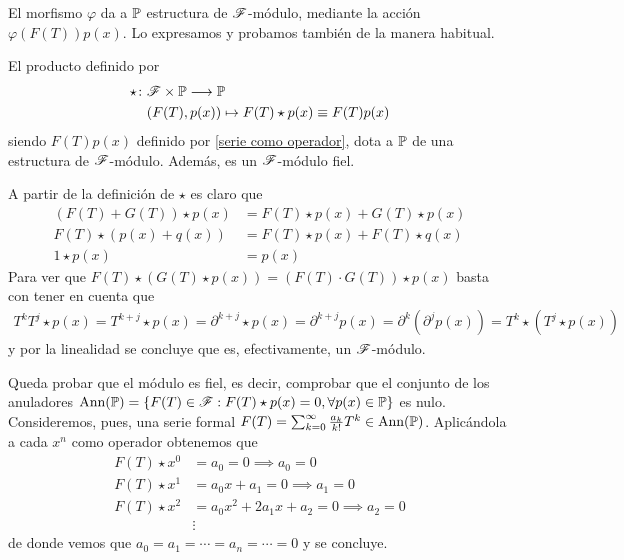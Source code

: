 El morfismo $\varphi$ da a $\mathbb{P}$ estructura de $\mathscr{F}$-módulo, mediante la acción $\varphi(F(T)) p(x)$. Lo expresamos y probamos también de la manera habitual.


\begin{teorema}
    El producto definido por
    \begin{align*}
        \star \colon & \mathscr{F} \times \mathbb{P} \longrightarrow \mathbb{P}\\
        & (F(T), p(x)) \mapsto F(T) \star p(x) \equiv F(T) p(x)
    \end{align*}
    siendo $F(T) p(x)$ definido por \eqref{serie como operador}, dota a $\mathbb{P}$ de una estructura de $\mathscr{F}$-módulo. Además, es un $\mathscr{F}$-módulo fiel.
\end{teorema}
\begin{demo}
    A partir de la definición de $\star$ es claro que
    \begin{align*}
        (F(T) + G(T)) \star p(x) & = F(T) \star p(x) + G(T) \star p(x)\\
        F(T) \star (p(x) + q(x)) & = F(T) \star p(x) + F(T) \star q(x)\\
        1 \star p(x) & = p(x)
    \end{align*}
    Para ver que $F(T) \star (G(T) \star p(x)) = (F(T) \cdot G(T)) \star p(x)$ basta con tener en cuenta que
    \begin{align*}
        T^k T^j \star p(x) = T^{k+j} \star p(x) = \partial^{k+j} \star p(x) = \partial^{k+j} p(x) = \partial^k(\partial^j p(x)) = T^k \star (T^j \star p(x)) 
    \end{align*}
    y por la linealidad se concluye que es, efectivamente, un $\mathscr{F}$-módulo.

    Queda probar que el módulo es fiel, es decir, comprobar que el conjunto de los anuladores $\text{Ann}(\mathbb{P}) = \{ F(T) \in \mathscr{F} : F(T) \star p(x) = 0, \forall p(x) \in \mathbb{P}\}$ es nulo. Consideremos, pues, una serie formal $F(T) = \sum_{k=0}^\infty \frac{a_k}{k!}T^k \in \text{Ann}(\mathbb{P})$. Aplicándola a cada $x^n$ como operador obtenemos que
    \begin{align*}
        F(T) \star x^0 & = a_0 = 0 \implies a_0 = 0\\
        F(T) \star x^1 & = a_0x + a_1 = 0 \implies a_1 = 0\\
        F(T) \star x^2 & = a_0x^2 + 2a_1x + a_2 = 0 \implies a_2 = 0\\
        &\vdots
    \end{align*}
    de donde vemos que $a_0 = a_1 = \cdots = a_n = \cdots = 0$ y se concluye.
\end{demo}


